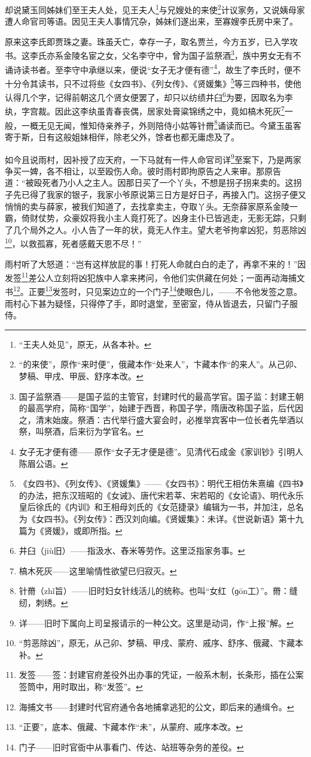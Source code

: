 \par 却说黛玉同姊妹们至王夫人处，见王夫人\footnote{ “王夫人处见”，原无，从各本补。}与兄嫂处的来使\footnote{“的来使”，原作“来时便”，俄藏本作“处来人”，卞藏本作“的来人”。从己卯、梦稿、甲戌、甲辰、舒序本改。}计议家务，又说姨母家遭人命官司等语。因见王夫人事情冗杂，姊妹们遂出来，至寡嫂李氏房中来了。
\par 原来这李氏即贾珠之妻。珠虽夭亡，幸存一子，取名贾兰，今方五岁，已入学攻书。这李氏亦系金陵名宦之女，父名李守中，曾为国子监祭酒\footnote{国子监祭酒——是国子监的主管官，封建时代的最高学官。国子监：封建王朝的最高学府，简称“国学”，始建于西晋，称国子学，隋唐改称国子监，后代因之，清末始废。祭酒：古代举行盛大宴会时，必推举宾客中一位长者先举酒以祭，叫祭酒，后来衍为学官名。}，族中男女无有不诵诗读书者。至李守中承继以来，便说“女子无才便有德”\footnote{女子无才便有德——原作“女子无才便是德”。见清代石成金《家训钞》引明人陈眉公语。}，故生了李氏时，便不十分令其读书，只不过将些《女四书》、《列女传》、《贤媛集》\footnote{《女四书》、《列女传》、《贤媛集》——《女四书》：明代王相仿朱熹编《四书》的办法，把东汉班昭的《女诫》、唐代宋若莘、宋若昭的《女论语》、明代永乐皇后徐氏的《内训》和王相母刘氏的《女范捷录》编辑为一书，并加注，总名为《女四书》。《列女传》：西汉刘向编。《贤媛集》：未详。《世说新语》第十九篇为《贤媛》，或即所指。}等三四种书，使他认得几个字，记得前朝这几个贤女便罢了，却只以纺绩井臼\footnote{井臼（jiù旧）——指汲水、舂米等劳作。这里泛指家务事。}为要，因取名为李纨，字宫裁。因此这李纨虽青春丧偶，居家处膏粱锦绣之中，竟如槁木死灰\footnote{槁木死灰——这里喻情性欲望已归寂灭。}一般，一概无见无闻，惟知侍亲养子，外则陪侍小姑等针黹\footnote{针黹（zhǐ旨）——旧时妇女针线活儿的统称。也叫“女红（ɡōn工）”。黹：缝纫，刺绣。}诵读而已。今黛玉虽客寄于斯，日有这般姐妹相伴，除老父外，馀者也都无庸虑及了。
\par 如今且说雨村，因补授了应天府，一下马就有一件人命官司详\footnote{详——旧时下属向上司呈报请示的一种公文。这里是动词，作“上报”解。}至案下，乃是两家争买一婢，各不相让，以至殴伤人命。彼时雨村即拘原告之人来审。那原告道：“被殴死者乃小人之主人。因那日买了一个丫头，不想是拐子拐来卖的。这拐子先已得了我家的银子，我家小爷原说第三日方是好日子，再接入门。这拐子便又悄悄的卖与薛家，被我们知道了，去找拿卖主，夺取丫头。无奈薛家原系金陵一霸，倚财仗势，众豪奴将我小主人竟打死了。凶身主仆已皆逃走，无影无踪，只剩了几个局外之人。小人告了一年的状，竟无人作主。望大老爷拘拿凶犯，剪恶除凶\footnote{“剪恶除凶”，原无，从己卯、梦稿、甲戌、蒙府、戚序、舒序、俄藏、卞藏本补。}，以救孤寡，死者感戴天恩不尽！”
\par 雨村听了大怒道：“岂有这样放屁的事！打死人命就白白的走了，再拿不来的！”因发签\footnote{发签——签：封建官府差役外出办事的凭证，一般系木制，长条形，插在公案签筒中，用时取出，称“发签”。}差公人立刻将凶犯族中人拿来拷问，令他们实供藏在何处；一面再动海捕文书\footnote{海捕文书——封建时代官府通令各地捕拿逃犯的公文，即后来的通缉令。}。正要\footnote{“正要”，底本、俄藏、卞藏本作“未”，从蒙府、戚序本改。}发签时，只见案边立的一个门子\footnote{门子——旧时官衙中从事看门、传达、站班等杂务的差役。}使眼色儿，——不令他发签之意。雨村心下甚为疑怪，只得停了手，即时退堂，至密室，侍从皆退去，只留门子服侍。
